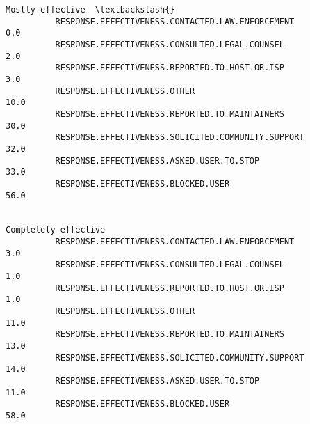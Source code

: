 \documentclass[11pt]{article}
\begin{document}
\begin{Verbatim}[commandchars=\\\{\}]
                                                              Mostly effective  \textbackslash{}
          RESPONSE.EFFECTIVENESS.CONTACTED.LAW.ENFORCEMENT                 0.0   
          RESPONSE.EFFECTIVENESS.CONSULTED.LEGAL.COUNSEL                   2.0   
          RESPONSE.EFFECTIVENESS.REPORTED.TO.HOST.OR.ISP                   3.0   
          RESPONSE.EFFECTIVENESS.OTHER                                    10.0   
          RESPONSE.EFFECTIVENESS.REPORTED.TO.MAINTAINERS                  30.0   
          RESPONSE.EFFECTIVENESS.SOLICITED.COMMUNITY.SUPPORT              32.0   
          RESPONSE.EFFECTIVENESS.ASKED.USER.TO.STOP                       33.0   
          RESPONSE.EFFECTIVENESS.BLOCKED.USER                             56.0   
          
                                                              Completely effective  
          RESPONSE.EFFECTIVENESS.CONTACTED.LAW.ENFORCEMENT                     3.0  
          RESPONSE.EFFECTIVENESS.CONSULTED.LEGAL.COUNSEL                       1.0  
          RESPONSE.EFFECTIVENESS.REPORTED.TO.HOST.OR.ISP                       1.0  
          RESPONSE.EFFECTIVENESS.OTHER                                        11.0  
          RESPONSE.EFFECTIVENESS.REPORTED.TO.MAINTAINERS                      13.0  
          RESPONSE.EFFECTIVENESS.SOLICITED.COMMUNITY.SUPPORT                  14.0  
          RESPONSE.EFFECTIVENESS.ASKED.USER.TO.STOP                           11.0  
          RESPONSE.EFFECTIVENESS.BLOCKED.USER                                 58.0  
\end{Verbatim}
        

    \begin{center}
    \end{center}
    { \hspace*{\fill} \\}
    
\end{document}
